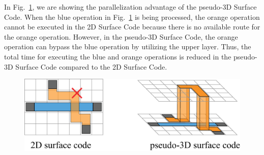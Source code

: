 \documentclass[a4paper,11pt]{ltjsarticle}
\begin{document}
{{        In Fig.~\ref{3D_advantage_parallel}, we are showing the parallelization advantage of the pseudo-3D Surface Code. When the blue operation in Fig.~\ref{3D_advantage_parallel} is being processed, the orange operation cannot be executed in the 2D Surface Code because there is no available route for the orange operation. However, in the pseudo-3D Surface Code, the orange operation can bypass the blue operation by utilizing the upper layer. Thus, the total time for executing the blue and orange operations is reduced in the pseudo-3D Surface Code compared to the 2D Surface Code.

        \begin{figure}[h]
            \centering
            \includegraphics[scale=0.30]{figure/3D_advantage_parallel.eps}
            \vspace{10pt}\caption{}
            \label{3D_advantage_parallel}
            \vspace{-10pt}
        \end{figure}
    }
}
\end{document}
